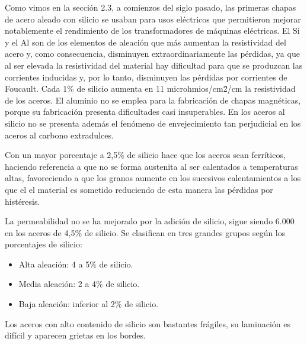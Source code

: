 \documentclass[12pt,a4paper]{article}
\begin{document}
Como vimos en la sección 2.3, a comienzos del siglo pasado, las primeras chapas de acero aleado con silicio se usaban para usos eléctricos que permitieron mejorar notablemente el rendimiento de los transformadores de máquinas eléctricas. El Si y el Al son de los elementos de aleación que más aumentan la resistividad del acero y, como consecuencia, disminuyen extraordinariamente las pérdidas, ya que al ser elevada la resistividad del material hay dificultad para que se produzcan las corrientes inducidas y, por lo tanto, disminuyen las pérdidas por corrientes de Foucault. Cada 1\% de silicio aumenta en 11 microhmios/cm\^2/cm la resistividad de los aceros. El aluminio no se emplea para la fabricación de chapas magnéticas, porque su fabricación presenta dificultades casi insuperables. En los aceros al silicio no se presenta además el fenómeno de envejecimiento tan perjudicial en los aceros al carbono extradulces.

Con un mayor porcentaje a 2,5\% de silicio hace que los aceros sean ferríticos, haciendo referencia a que no se forma austenita al ser calentados a temperaturas altas, favoreciendo a que los granos aumente en los sucesivos calentamientos a los que el el material es sometido reduciendo de esta manera las pérdidas por histéresis.

La permeabilidad no se ha mejorado por la adición de silicio, sigue siendo 6.000 en los aceros de 4,5\% de silicio. Se clasifican en tres grandes grupos según los porcentajes de silicio: 

\begin{itemize}
    \item Alta aleación: 4 a 5\% de silicio.
    \item Media aleación: 2 a 4\% de silicio.
    \item Baja aleación: inferior al 2\% de silicio.
\end{itemize}

Los aceros con alto contenido de silicio son bastantes frágiles, su laminación es difícil y aparecen grietas en los bordes.
\end{document}
